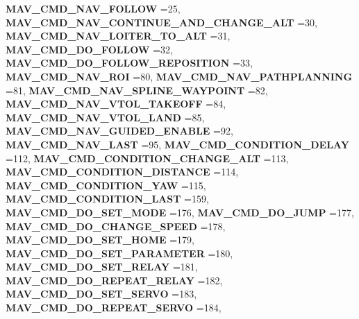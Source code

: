 \begin{DoxyCompactItemize}
\textbf{ M\+A\+V\+\_\+\+C\+M\+D\+\_\+\+N\+A\+V\+\_\+\+F\+O\+L\+L\+OW} =25, 
\textbf{ M\+A\+V\+\_\+\+C\+M\+D\+\_\+\+N\+A\+V\+\_\+\+C\+O\+N\+T\+I\+N\+U\+E\+\_\+\+A\+N\+D\+\_\+\+C\+H\+A\+N\+G\+E\+\_\+\+A\+LT} =30, 
\textbf{ M\+A\+V\+\_\+\+C\+M\+D\+\_\+\+N\+A\+V\+\_\+\+L\+O\+I\+T\+E\+R\+\_\+\+T\+O\+\_\+\+A\+LT} =31, 
\newline
\textbf{ M\+A\+V\+\_\+\+C\+M\+D\+\_\+\+D\+O\+\_\+\+F\+O\+L\+L\+OW} =32, 
\textbf{ M\+A\+V\+\_\+\+C\+M\+D\+\_\+\+D\+O\+\_\+\+F\+O\+L\+L\+O\+W\+\_\+\+R\+E\+P\+O\+S\+I\+T\+I\+ON} =33, 
\textbf{ M\+A\+V\+\_\+\+C\+M\+D\+\_\+\+N\+A\+V\+\_\+\+R\+OI} =80, 
\textbf{ M\+A\+V\+\_\+\+C\+M\+D\+\_\+\+N\+A\+V\+\_\+\+P\+A\+T\+H\+P\+L\+A\+N\+N\+I\+NG} =81, 
\newline
\textbf{ M\+A\+V\+\_\+\+C\+M\+D\+\_\+\+N\+A\+V\+\_\+\+S\+P\+L\+I\+N\+E\+\_\+\+W\+A\+Y\+P\+O\+I\+NT} =82, 
\textbf{ M\+A\+V\+\_\+\+C\+M\+D\+\_\+\+N\+A\+V\+\_\+\+V\+T\+O\+L\+\_\+\+T\+A\+K\+E\+O\+FF} =84, 
\textbf{ M\+A\+V\+\_\+\+C\+M\+D\+\_\+\+N\+A\+V\+\_\+\+V\+T\+O\+L\+\_\+\+L\+A\+ND} =85, 
\textbf{ M\+A\+V\+\_\+\+C\+M\+D\+\_\+\+N\+A\+V\+\_\+\+G\+U\+I\+D\+E\+D\+\_\+\+E\+N\+A\+B\+LE} =92, 
\newline
\textbf{ M\+A\+V\+\_\+\+C\+M\+D\+\_\+\+N\+A\+V\+\_\+\+L\+A\+ST} =95, 
\textbf{ M\+A\+V\+\_\+\+C\+M\+D\+\_\+\+C\+O\+N\+D\+I\+T\+I\+O\+N\+\_\+\+D\+E\+L\+AY} =112, 
\textbf{ M\+A\+V\+\_\+\+C\+M\+D\+\_\+\+C\+O\+N\+D\+I\+T\+I\+O\+N\+\_\+\+C\+H\+A\+N\+G\+E\+\_\+\+A\+LT} =113, 
\textbf{ M\+A\+V\+\_\+\+C\+M\+D\+\_\+\+C\+O\+N\+D\+I\+T\+I\+O\+N\+\_\+\+D\+I\+S\+T\+A\+N\+CE} =114, 
\newline
\textbf{ M\+A\+V\+\_\+\+C\+M\+D\+\_\+\+C\+O\+N\+D\+I\+T\+I\+O\+N\+\_\+\+Y\+AW} =115, 
\textbf{ M\+A\+V\+\_\+\+C\+M\+D\+\_\+\+C\+O\+N\+D\+I\+T\+I\+O\+N\+\_\+\+L\+A\+ST} =159, 
\textbf{ M\+A\+V\+\_\+\+C\+M\+D\+\_\+\+D\+O\+\_\+\+S\+E\+T\+\_\+\+M\+O\+DE} =176, 
\textbf{ M\+A\+V\+\_\+\+C\+M\+D\+\_\+\+D\+O\+\_\+\+J\+U\+MP} =177, 
\newline
\textbf{ M\+A\+V\+\_\+\+C\+M\+D\+\_\+\+D\+O\+\_\+\+C\+H\+A\+N\+G\+E\+\_\+\+S\+P\+E\+ED} =178, 
\textbf{ M\+A\+V\+\_\+\+C\+M\+D\+\_\+\+D\+O\+\_\+\+S\+E\+T\+\_\+\+H\+O\+ME} =179, 
\textbf{ M\+A\+V\+\_\+\+C\+M\+D\+\_\+\+D\+O\+\_\+\+S\+E\+T\+\_\+\+P\+A\+R\+A\+M\+E\+T\+ER} =180, 
\textbf{ M\+A\+V\+\_\+\+C\+M\+D\+\_\+\+D\+O\+\_\+\+S\+E\+T\+\_\+\+R\+E\+L\+AY} =181, 
\newline
\textbf{ M\+A\+V\+\_\+\+C\+M\+D\+\_\+\+D\+O\+\_\+\+R\+E\+P\+E\+A\+T\+\_\+\+R\+E\+L\+AY} =182, 
\textbf{ M\+A\+V\+\_\+\+C\+M\+D\+\_\+\+D\+O\+\_\+\+S\+E\+T\+\_\+\+S\+E\+R\+VO} =183, 
\textbf{ M\+A\+V\+\_\+\+C\+M\+D\+\_\+\+D\+O\+\_\+\+R\+E\+P\+E\+A\+T\+\_\+\+S\+E\+R\+VO} =184, 

\end{DoxyCompactItemize}

